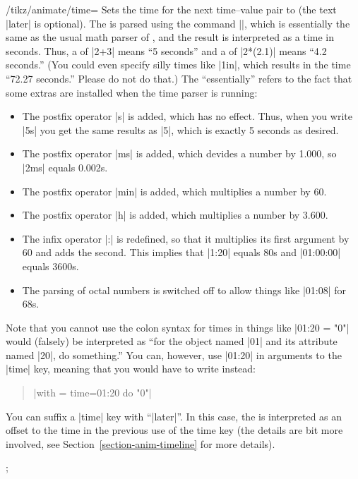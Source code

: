 \begin{key}{/tikz/animate/time=}
  Sets the time for the next time--value pair to  (the text
  |later| is optional). 
  The  is parsed using the command |\pgfparsetime|, which is
  essentially the same as the usual math parser of \tikzname, and the
  result is interpreted as a time in seconds. Thus, a  of |2+3|
  means ``5 seconds'' and a  of |2*(2.1)| means ``4.2
  seconds.'' (You could even specify silly times like |1in|, which
  results in the time ``72.27 seconds.'' Please do not do that.)
  The ``essentially''  refers to the fact that some extras are installed
  when the time parser is running:
  
  \begin{itemize}
  \item 
    The postfix operator |s| is added, which has no effect. Thus, when
    you write |5s| you get the same results as |5|, which is exactly 5
    seconds as desired.
  \item The postfix operator |ms| is added, which devides a number by
    1.000, so |2ms| equals 0.002s.
  \item
    The postfix operator |min| is added, which multiplies a number by
    60.
  \item The postfix operator |h| is added, which multiplies a number by
    3.600.
  \item The infix operator |:| is redefined, so that it multiplies its
    first argument by 60 and adds the second. This implies that
    |1:20| equals 80s and |01:00:00| equals 3600s. 
  \item The parsing of octal numbers is switched off to allow things
    like |01:08| for 68s. 
  \end{itemize}

  Note that you cannot use the colon syntax for times in things like
  |01:20 = "0"| would (falsely) be interpreted as ``for the object named
  |01| and its attribute named |20|, do something.'' You can, however,
  use |01:20| in arguments to the |time| key, meaning that you would
  have to write instead:
  \begin{quote}
    \normalfont
    |with = {time=01:20} do "0"|
  \end{quote}

  You can suffix a |time| key with ``|later|''. In this case, the
   is interpreted as an offset to the time in the previous
  use of the time key (the details are bit more involved, see
  Section~\ref{section-anim-timeline} for more details).

\begin{codeexample}[animation list={0.5,1,1.5,2}]
\tikz {};
\end{codeexample}
\end{key}


